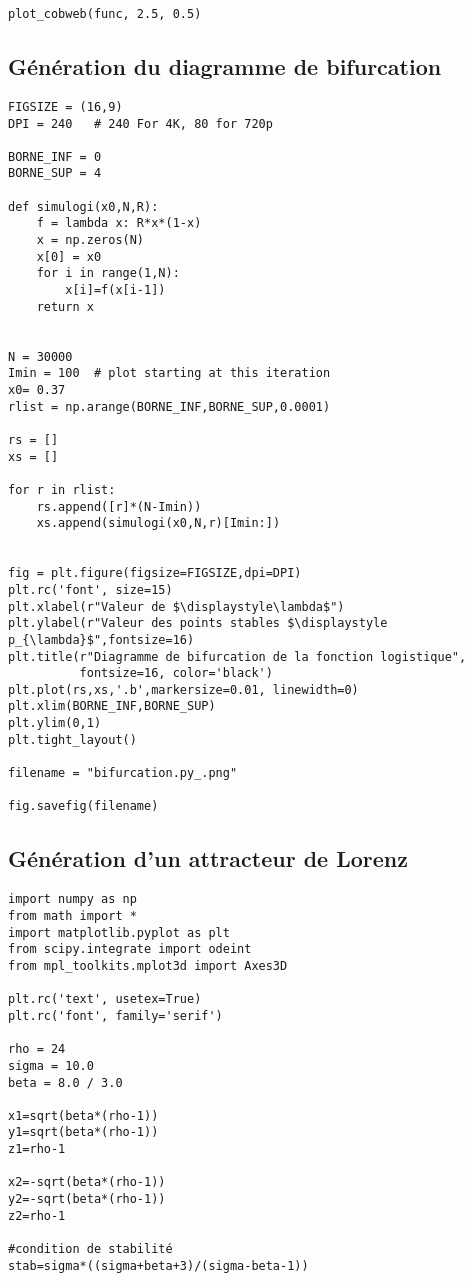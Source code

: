 \begin{appendices}
\begin{verbatim}
plot_cobweb(func, 2.5, 0.5)
    \end{verbatim}
    \newpage
\subsection{Génération du diagramme de bifurcation}
\begin{verbatim}
FIGSIZE = (16,9)
DPI = 240   # 240 For 4K, 80 for 720p

BORNE_INF = 0
BORNE_SUP = 4

def simulogi(x0,N,R):
    f = lambda x: R*x*(1-x)
    x = np.zeros(N)
    x[0] = x0
    for i in range(1,N):
        x[i]=f(x[i-1])
    return x


N = 30000
Imin = 100  # plot starting at this iteration
x0= 0.37
rlist = np.arange(BORNE_INF,BORNE_SUP,0.0001)

rs = []
xs = []

for r in rlist:
    rs.append([r]*(N-Imin))
    xs.append(simulogi(x0,N,r)[Imin:])


fig = plt.figure(figsize=FIGSIZE,dpi=DPI)
plt.rc('font', size=15)
plt.xlabel(r"Valeur de $\displaystyle\lambda$")
plt.ylabel(r"Valeur des points stables $\displaystyle p_{\lambda}$",fontsize=16)
plt.title(r"Diagramme de bifurcation de la fonction logistique",
          fontsize=16, color='black')
plt.plot(rs,xs,'.b',markersize=0.01, linewidth=0)
plt.xlim(BORNE_INF,BORNE_SUP)
plt.ylim(0,1)
plt.tight_layout()

filename = "bifurcation.py_.png"

fig.savefig(filename)
        \end{verbatim}

\newpage
\subsection{Génération d'un attracteur de Lorenz}
\begin{verbatim}
import numpy as np
from math import *
import matplotlib.pyplot as plt
from scipy.integrate import odeint
from mpl_toolkits.mplot3d import Axes3D

plt.rc('text', usetex=True)
plt.rc('font', family='serif')

rho = 24
sigma = 10.0
beta = 8.0 / 3.0

x1=sqrt(beta*(rho-1))
y1=sqrt(beta*(rho-1))
z1=rho-1
    
x2=-sqrt(beta*(rho-1))
y2=-sqrt(beta*(rho-1))
z2=rho-1

#condition de stabilité
stab=sigma*((sigma+beta+3)/(sigma-beta-1))


\end{verbatim}
\end{appendices}
